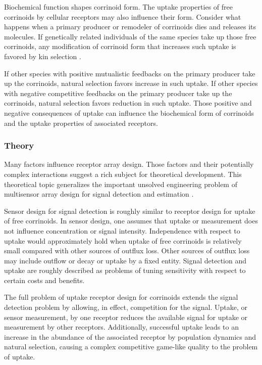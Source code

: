 \documentclass[\mydocfontsize]{article}
\begin{document}
\begin{multicols}{2}
 Biochemical function shapes corrinoid form. The uptake properties of free corrinoids by cellular receptors may also influence their form. Consider what happens when a primary producer or remodeler of corrinoids dies and releases its molecules. If genetically related individuals of the same species take up those free corrinoids, any modification of corrinoid form that increases such uptake is favored by kin selection \autocite{hamilton72altruism,frank98foundations}. 

If other species with positive mutualistic feedbacks on the primary producer take up the corrinoids, natural selection favors increase in such uptake. If other species with negative competitive feedbacks on the primary producer take up the corrinoids, natural selection favors reduction in such uptake. Those positive and negative consequences of uptake can influence the biochemical form of corrinoids and the uptake properties of associated receptors.

\subsubsection{Theory}

Many factors influence receptor array design. Those factors and their potentially complex interactions suggest a rich subject for theoretical development. This theoretical topic generalizes the important unsolved engineering problem of multisensor array design for signal detection and estimation \autocite{bicchi94optimal,johnson15sensor}. 

Sensor design for signal detection is roughly similar to receptor design for uptake of free corrinoids. In sensor design, one assumes that uptake or measurement does not influence concentration or signal intensity. Independence with respect to uptake would approximately hold when uptake of free corrinoids is relatively small compared with other sources of outflux loss. Other sources of outflux loss may include outflow or decay or uptake by a fixed entity. Signal detection and uptake are roughly described as problems of tuning sensitivity with respect to certain costs and benefits.

The full problem of uptake receptor design for corrinoids extends the signal detection problem by allowing, in effect, competition for the signal. Uptake, or sensor measurement, by one receptor reduces the available signal for uptake or measurement by other receptors. Additionally, successful uptake leads to an increase in the abundance of the associated receptor by population dynamics and natural selection, causing a complex competitive game-like quality to the problem of uptake. 


\end{multicols}
\end{document}
